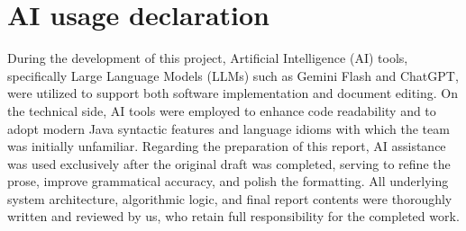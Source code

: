 \section{AI usage declaration}
During the development of this project, Artificial Intelligence (AI) tools, specifically Large Language Models (LLMs) such as Gemini Flash and ChatGPT, were utilized to support both software implementation and document editing. On the technical side, AI tools were employed to enhance code readability and to adopt modern Java syntactic features and language idioms with which the team was initially unfamiliar. Regarding the preparation of this report, AI assistance was used exclusively after the original draft was completed, serving to refine the prose, improve grammatical accuracy, and polish the formatting. All underlying system architecture, algorithmic logic, and final report contents were thoroughly written and reviewed by us, who retain full responsibility for the completed work.

